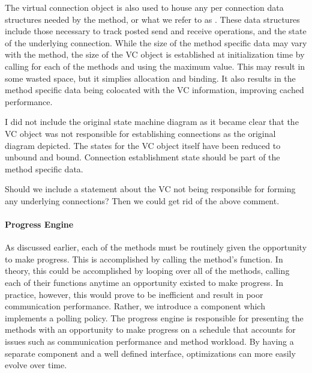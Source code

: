 The virtual connection object is also used to house any per connection data
structures needed by the method, or what we refer to as .  These data structures include those necessary to track posted send
and receive operations, and the state of the underlying connection.  While the
size of the method specific data may vary with the method, the size of the VC
object is established at initialization time by calling
 for each of the methods and using the maximum
value.  This may result in some wasted space, but it simplies allocation and
binding.  It also results in the method specific data being colocated with the
VC information, improving cached performance.

\begin{cmt}[BRT]
  I did not include the original state machine diagram as it became clear that
  the VC object was not responsible for establishing connections as the
  original diagram depicted.  The states for the VC object itself have been
  reduced to unbound and bound.  Connection establishment state should be part
  of the method specific data.
\end{cmt}

\Q Should we include a statement about the VC not being responsible for forming
any underlying connections?  Then we could get rid of the above comment.


\paragraph{Progress Engine}


As discussed earlier, each of the methods must be routinely given the
opportunity to make progress.  This is accomplished by calling the method's
 function.  In theory, this could be accomplished by looping over
all of the methods, calling each of their  functions anytime an
opportunity existed to make progress.  In practice, however, this would prove
to be inefficient and result in poor communication performance.  Rather, we
introduce a  component which implements a polling policy.
The progress engine is responsible for presenting the methods with an
opportunity to make progress on a schedule that accounts for issues such as
communication performance and method workload.  By having a separate component
and a well defined interface, optimizations can more easily evolve over time.

